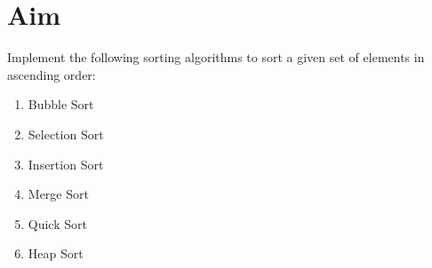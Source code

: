 
\section{Aim}
Implement the following sorting algorithms to sort a given set of elements in ascending order:
\begin{enumerate}
  \item Bubble Sort
  \item Selection Sort
  \item Insertion Sort
  \item Merge Sort
  \item Quick Sort
  \item Heap Sort
\end{enumerate}

